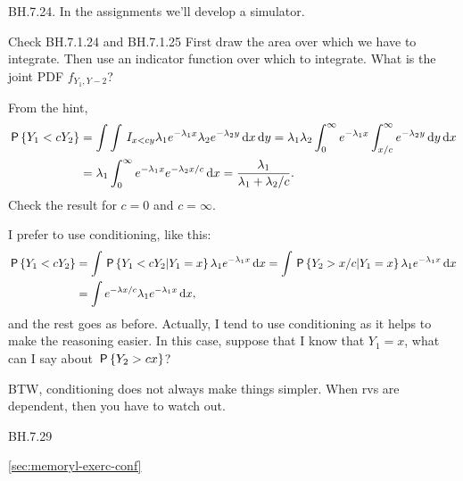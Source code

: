 \begin{exercise}
BH.7.24.
In the assignments we'll develop a simulator.

\begin{hint}
Check BH.7.1.24 and BH.7.1.25
First draw the area over which we have to integrate. Then use an indicator function over which to integrate. What is the joint PDF  $f_{Y_1, Y-2}$?
\end{hint}
\begin{solution}
From the hint,
\begin{align*}
\P{Y_1<c Y_2}
  &= \int \int \1{x<c y}\lambda_1 e^{-\lambda_1 x} \lambda_2e^{-\lambda_2 y}\d x \d y
  = \lambda_1\lambda_2\int_0^{\infty} e^{-\lambda_{1}x}\int_{x/c}^{\infty} e^{-\lambda_{2} y}\d y \d x\\
  & = \lambda_1\int_0^{\infty} e^{-\lambda_{1}x} e^{-\lambda_{2} x/c} \d x
  = \frac{\lambda_1}{\lambda_1+\lambda_2/c}.
\end{align*}
Check the result for $c=0$ and $c=\infty$.

I prefer to use conditioning, like this:
\begin{align*}
\P{Y_1<c Y_2}
  &= \int \P{Y_1<cY_2| Y_1=x}\lambda_1 e^{-\lambda_1 x} \d x
  = \int \P{Y_2>x/c| Y_1=x}\lambda_1 e^{-\lambda_1 x} \d x\\
&= \int e^{-\lambda x/c} \lambda_1 e^{-\lambda_1 x} \d x,
\end{align*}
and the rest goes as before. Actually, I tend to use conditioning as it helps to make the reasoning easier. In this case, suppose that I know that $Y_1=x$, what can I say about $\P{Y_2 > c x}$?

BTW, conditioning does not always make things simpler. When rvs are dependent, then you have to watch out.
\end{solution}
\end{exercise}


\begin{exercise}
BH.7.29
\begin{hint}
\cref{sec:memoryl-exerc-conf}
\end{hint}
\begin{solution}
\end{solution}
\end{exercise}


